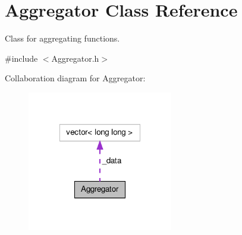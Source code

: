 \hypertarget{classAggregator}{\section{Aggregator Class Reference}
\label{classAggregator}
}


Class for aggregating functions.  




{\ttfamily \#include $<$Aggregator.\-h$>$}



Collaboration diagram for Aggregator\-:\nopagebreak
\begin{figure}[H]
\begin{center}
\leavevmode
\includegraphics[width=180pt]{classAggregator__coll__graph}
\end{center}
\end{figure}
